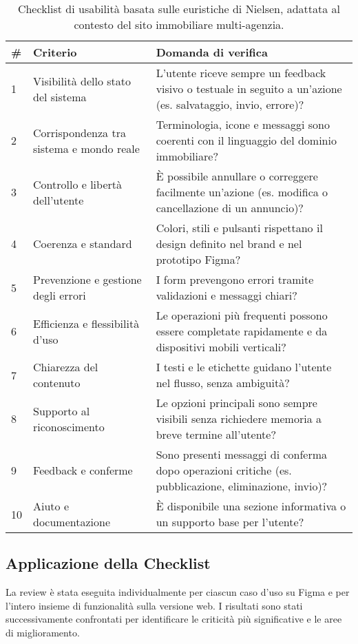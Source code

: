 \begin{table}[h!]
\centering
\begin{tabular}{p{0.8cm} p{4cm} p{7cm}}
\hline
\textbf{\#} & \textbf{Criterio} & \textbf{Domanda di verifica} \\
\hline
1 & Visibilità dello stato del sistema & L’utente riceve sempre un feedback visivo o testuale in seguito a un’azione (es. salvataggio, invio, errore)? \\
2 & Corrispondenza tra sistema e mondo reale & Terminologia, icone e messaggi sono coerenti con il linguaggio del dominio immobiliare? \\
3 & Controllo e libertà dell’utente & È possibile annullare o correggere facilmente un’azione (es. modifica o cancellazione di un annuncio)? \\
4 & Coerenza e standard & Colori, stili e pulsanti rispettano il design definito nel brand e nel prototipo Figma? \\
5 & Prevenzione e gestione degli errori & I form prevengono errori tramite validazioni e messaggi chiari? \\
6 & Efficienza e flessibilità d’uso & Le operazioni più frequenti possono essere completate rapidamente e da dispositivi mobili verticali? \\
7 & Chiarezza del contenuto & I testi e le etichette guidano l’utente nel flusso, senza ambiguità? \\
8 & Supporto al riconoscimento & Le opzioni principali sono sempre visibili senza richiedere memoria a breve termine all’utente? \\
9 & Feedback e conferme & Sono presenti messaggi di conferma dopo operazioni critiche (es. pubblicazione, eliminazione, invio)? \\
10 & Aiuto e documentazione & È disponibile una sezione informativa o un supporto base per l’utente? \\
\hline
\end{tabular}
\caption{Checklist di usabilità basata sulle euristiche di Nielsen, adattata al contesto del sito immobiliare multi-agenzia.}
\label{tab:checklist_usabilita}
\end{table}

\subsection*{Applicazione della Checklist}

La review è stata eseguita individualmente per ciascun caso d’uso su Figma e per l’intero insieme di funzionalità sulla versione web.  
I risultati sono stati successivamente confrontati per identificare le criticità più significative e le aree di miglioramento.

